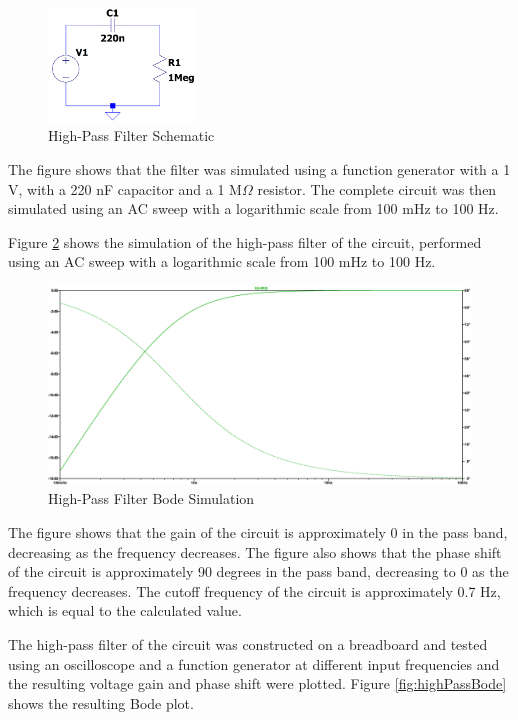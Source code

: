\documentclass[CMPE]{KGCOEReport}
\begin{document}
\begin{figure}[H]
    \centering
    \includegraphics[width=0.35\textwidth]{HighPass.png}
    \caption{High-Pass Filter Schematic}
    \label{fig:ltspiceHighPassSchematic}
\end{figure}

The figure shows that the filter was simulated using a function generator with a 1 V, with a 220 nF capacitor and a 1 M$\Omega$ resistor. The complete circuit was then simulated using an AC sweep with a logarithmic scale from 100 mHz to 100 Hz.

Figure \ref{fig:highPassSim} shows the simulation of the high-pass filter of the circuit, performed using an AC sweep with a logarithmic scale from 100 mHz to 100 Hz.

\begin{figure}[H]
    \centering
    \includegraphics[width=1\textwidth]{SimFreqHighPass.png}
    \caption{High-Pass Filter Bode Simulation}
    \label{fig:highPassSim}
\end{figure}

The figure shows that the gain of the circuit is approximately 0 in the pass band, decreasing as the frequency decreases. The figure also shows that the phase shift of the circuit is approximately 90 degrees in the pass band, decreasing to 0 as the frequency decreases. The cutoff frequency of the circuit is approximately 0.7 Hz, which is equal to the calculated value.

The high-pass filter of the circuit was constructed on a breadboard and tested using an oscilloscope and a function generator at different input frequencies and the resulting voltage gain and phase shift were plotted. Figure \ref{fig:highPassBode} shows the resulting Bode plot.
\end{document}
